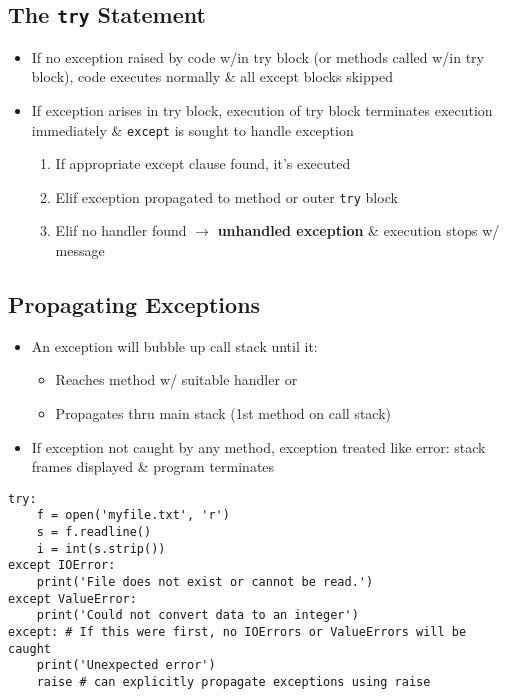 \documentclass{article}
\begin{document}
\subsection{The \texttt{try} Statement}
    \begin{multicols}{2}
        \begin{itemize}
            \item If no exception raised by code w/in try block (or methods called w/in try block), code executes normally \& all except blocks skipped
            \item If exception arises in try block, execution of try block terminates execution immediately \& \texttt{except} is sought to handle exception
                \begin{enumerate}
                    \item If appropriate except clause found, it's executed
                    \item Elif exception propagated to method or outer \texttt{try} block
                    \item Elif no handler found $\rightarrow$ \textbf{unhandled exception} \& execution stops w/ message
                \end{enumerate}
        \end{itemize}
    \end{multicols}
    
\subsection{Propagating Exceptions}
    \begin{multicols}{2}
        \begin{itemize}
            \item An exception will bubble up call stack until it:
                \begin{itemize}
                    \item Reaches method w/ suitable handler or
                    \item Propagates thru main stack (1st method on call stack)
                \end{itemize}
            \item If exception not caught by any method, exception treated like error: stack frames displayed \& program terminates
        \end{itemize}
    \end{multicols}
\vspace{-2em}
\begin{lstlisting}
try:
    f = open('myfile.txt', 'r')
    s = f.readline()
    i = int(s.strip())
except IOError:
    print('File does not exist or cannot be read.')
except ValueError:
    print('Could not convert data to an integer')
except: # If this were first, no IOErrors or ValueErrors will be caught
    print('Unexpected error')
    raise # can explicitly propagate exceptions using raise
\end{lstlisting}
\end{document}
